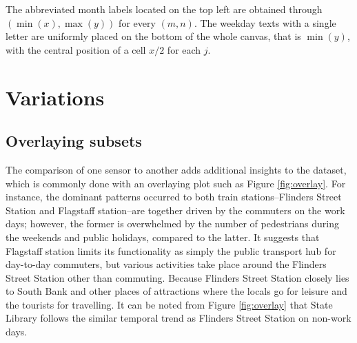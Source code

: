 \documentclass[article]{jss}
\begin{document}
The abbreviated month labels located on the top left are obtained
through \((\min{(x)}, \max{(y)})\) for every \((m, n)\). The weekday
texts with a single letter are uniformly placed on the bottom of the
whole canvas, that is \(\min{(y)}\), with the central position of a cell
\(x / 2\) for each \(j\).

\section{Variations}\label{variations}

\label{sec:examples}

\subsection{Overlaying subsets}\label{overlaying-subsets}

The comparison of one sensor to another adds additional insights to the
dataset, which is commonly done with an overlaying plot such as Figure
\ref{fig:overlay}. For instance, the dominant patterns occurred to both
train stations--Flinders Street Station and Flagstaff station--are
together driven by the commuters on the work days; however, the former
is overwhelmed by the number of pedestrians during the weekends and
public holidays, compared to the latter. It suggests that Flagstaff
station limits its functionality as simply the public transport hub for
day-to-day commuters, but various activities take place around the
Flinders Street Station other than commuting. Because Flinders Street
Station closely lies to South Bank and other places of attractions where
the locals go for leisure and the tourists for travelling. It can be
noted from Figure \ref{fig:overlay} that State Library follows the
similar temporal trend as Flinders Street Station on non-work days.
\end{document}
